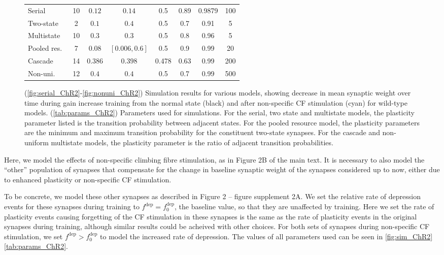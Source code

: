 \documentclass[10pt]{article}
\renewenvironment{myenumA}{\begin{inparaenum}[\bfseries A]}{\end{inparaenum}}
\newcommand{\dep}{^{\text{dep}}}
\newcommand{\norm}{_0}
\newcommand{\chrfig}[1][B]{Figure 2#1 of the main text}
\newcommand{\compfig}[1][A]{Figure 2 -- figure supplement 2#1}
\begin{document}
\begin{figure}
\begin{preview}
\begin{myenumA}
{\begin{tabular}{|l|c|c|c|c|c|c|c|}
    \cline{1-8}
    Serial       & 10 & $0.12$  & $0.14$        & 0.5   & 0.89 & 0.9879 & 100 \\
    Two-state    & 2  & $0.1$   & $0.4$         & 0.5   & 0.7  & 0.91   & 5   \\
    Multistate   & 10 & $0.3$   & $0.3$         & 0.5   & 0.8  & 0.96   & 5   \\
    Pooled res.\ & 7  & $0.08$  & $[0.006,0.6]$ & 0.5   & 0.9  & 0.99   & 20  \\
    Cascade      & 14 & $0.386$ & $0.398$       & 0.478 & 0.63 & 0.99   & 200  \\
    Non-uni.\    & 12 & $0.4$   & $0.4$         & 0.5   & 0.7  & 0.99   & 500  \\
    \cline{1-8}
  \end{tabular}}
  \end{myenumA}
\end{preview}
  \caption[Simulation results for various models]{(\ref{fig:serial_ChR2}-\ref{fig:nonuni_ChR2}) Simulation results for various models, showing decrease in mean synaptic weight over time during gain increase training from the normal state (black) and after non-specific CF stimulation (cyan) for wild-type models.
  (\ref{tab:params_ChR2}) Parameters used for simulations.
  For the serial, two state and multistate models, the plasticity parameter listed is the transition probability between adjacent states.
  For the pooled resource model, the plasticity parameters are the minimum and maximum transition probability for the constituent two-state synapses.
  For the cascade and non-uniform multistate models, the plasticity parameter is the ratio of adjacent transition probabilities.}\label{fig:sim_ChR2}
\end{figure}


Here, we model the effects of non-specific climbing fibre stimulation, as in \chrfig.
It is necessary to also model the ``other'' population of synapses that compensate for the change in baseline synaptic weight of the synapses considered up to now, either due to enhanced plasticity or non-specific CF stimulation.

To be concrete, we model these other synapses as described in \compfig.
We set the relative rate of depression events for these synapses during training to $f\dep = f\dep\norm$, \ie the baseline value, so that they are unaffected by training.
Here we set the rate of plasticity events causing forgetting of the CF stimulation in these synapses is the same as the rate of plasticity events in the original synapses during training, although similar results could be acheived with other choices.
For both sets of synapses during non-specific CF stimulation, we set $f\dep > f\dep\norm$ to model the increased rate of depression.
The values of all parameters used can be seen in \autoref{fig:sim_ChR2}\ref{tab:params_ChR2}.
\end{document}
